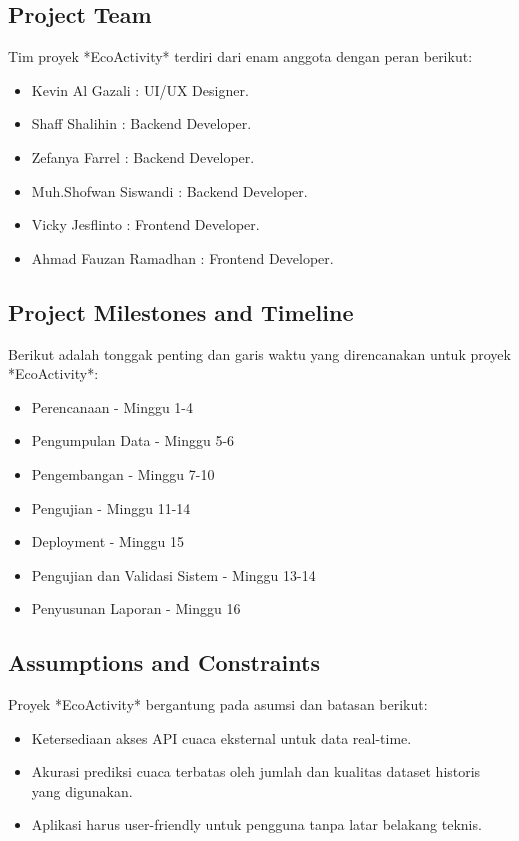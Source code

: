 \documentclass[journal,article,submit,pdftex,moreauthors]{Definitions/mdpi}
\begin{document}
\subsection{Project Team}

Tim proyek *EcoActivity* terdiri dari enam anggota dengan peran berikut:
\begin{itemize}
    \item Kevin Al Gazali : UI/UX Designer.
    \item Shaff Shalihin : Backend Developer.
    \item Zefanya Farrel : Backend Developer.
    \item Muh.Shofwan Siswandi : Backend Developer.
    \item Vicky Jesflinto : Frontend Developer.
    \item Ahmad Fauzan Ramadhan : Frontend Developer.
\end{itemize}
\subsection{Project Milestones and Timeline}

Berikut adalah tonggak penting dan garis waktu yang direncanakan untuk proyek *EcoActivity*:
\begin{itemize}
    \item Perencanaan - Minggu 1-4
    \item Pengumpulan Data - Minggu 5-6
    \item Pengembangan - Minggu 7-10
    \item Pengujian - Minggu 11-14
    \item Deployment - Minggu 15
    \item Pengujian dan Validasi Sistem - Minggu 13-14
    \item Penyusunan Laporan - Minggu 16
\end{itemize}
\subsection{Assumptions and Constraints}

Proyek *EcoActivity* bergantung pada asumsi dan batasan berikut:
\begin{itemize}
    \item Ketersediaan akses API cuaca eksternal untuk data real-time.
    \item Akurasi prediksi cuaca terbatas oleh jumlah dan kualitas dataset historis yang digunakan.
    \item Aplikasi harus user-friendly untuk pengguna tanpa latar belakang teknis.
\end{itemize}
\end{document}
